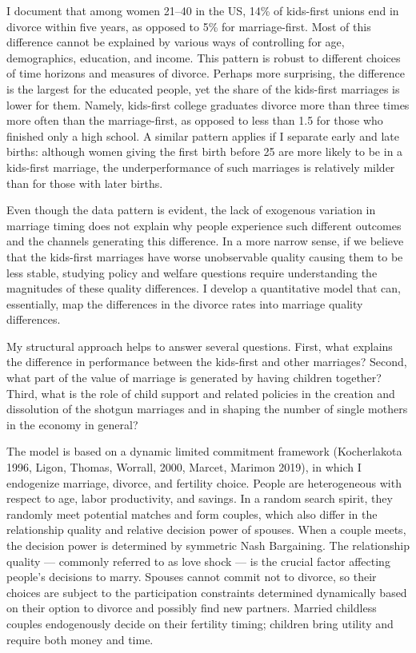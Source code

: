 \documentclass[12pt,letter]{article}
\begin{document}
I document that among women 21--40 in the US, 14\% of kids-first unions end in divorce within five years, as opposed to 5\% for marriage-first. Most of this difference cannot be explained by various ways of controlling for age, demographics, education, and income. This pattern is robust to different choices of time horizons and measures of divorce. Perhaps more surprising, the difference is the largest for the educated people, yet the share of the kids-first marriages is lower for them. Namely, kids-first college graduates divorce more than three times more often than the marriage-first, as opposed to less than 1.5 for those who finished only a high school. A similar pattern applies if I separate early and late births: although women giving the first birth before 25 are more likely to be in a kids-first marriage, the underperformance of such marriages is relatively milder than for those with later births.

Even though the data pattern is evident, the lack of exogenous variation in marriage timing does not explain why people experience such different outcomes and the channels generating this difference. In a more narrow sense, if we believe that the kids-first marriages have worse unobservable quality causing them to be less stable, studying policy and welfare questions require understanding the magnitudes of these quality differences. I develop a quantitative model that can, essentially, map the differences in the divorce rates into marriage quality differences. 

My structural approach helps to answer several questions. First, what explains the difference in performance between the kids-first and other marriages? Second, what part of the value of marriage is generated by having children together? Third, what is the role of child support and related policies in the creation and dissolution of the shotgun marriages and in shaping the number of single mothers in the economy in general?

The model is based on a dynamic limited commitment framework (Kocherlakota 1996\nocite{kocherlakota1996implications}, Ligon, Thomas, Worrall, 2000\nocite{ligon2000mutual}, Marcet, Marimon 2019\nocite{marcet2019recursive}),  in which I endogenize marriage, divorce, and fertility choice. People are heterogeneous with respect to age, labor productivity, and savings. In a random search spirit, they randomly meet potential matches and form couples, which also differ in the relationship quality and relative decision power of spouses. When a couple meets, the decision power is determined by symmetric Nash Bargaining. The relationship quality --- commonly referred to as love shock --- is the crucial factor affecting people's decisions to marry. Spouses cannot commit not to divorce, so their choices are subject to the participation constraints determined dynamically based on their option to divorce and possibly find new partners. Married childless couples endogenously decide on their fertility timing; children bring utility and require both money and time.
\end{document}
